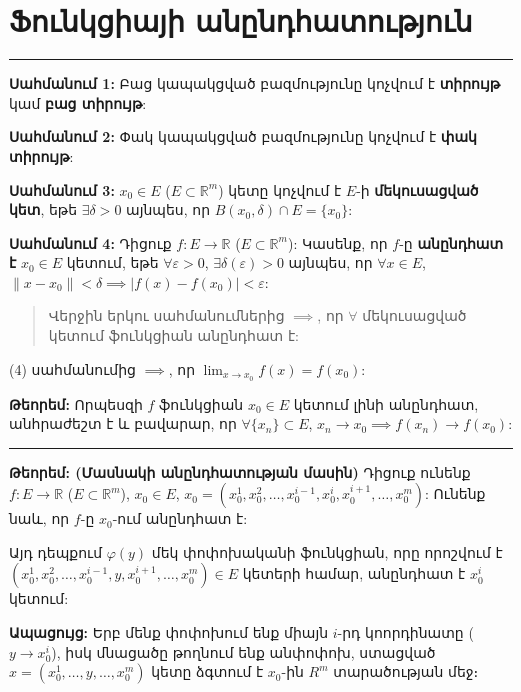 \documentclass[12pt, a4paper]{article}
\begin{document}
\section{Ֆունկցիայի անընդհատություն}

\tableofcontents

\vspace{2em}
\hrule
\vspace{2em}

\textbf{Սահմանում 1:} Բաց կապակցված բազմությունը կոչվում է \textbf{տիրույթ} կամ \textbf{բաց տիրույթ}:

\textbf{Սահմանում 2:} Փակ կապակցված բազմությունը կոչվում է \textbf{փակ տիրույթ}:

\textbf{Սահմանում 3:} $x_0 \in E$ ($E \subset \mathbb{R}^m$) կետը կոչվում է $E$-ի \textbf{մեկուսացված կետ}, եթե $\exists \delta > 0$ այնպես, որ $B(x_0, \delta) \cap E = \{x_0\}$:

\textbf{Սահմանում 4:} Դիցուք $f: E \to \mathbb{R}$ ($E \subset \mathbb{R}^m$): Կասենք, որ $f$-ը \textbf{անընդհատ է} $x_0 \in E$ կետում, եթե $\forall \varepsilon > 0$, $\exists \delta(\varepsilon) > 0$ այնպես, որ $\forall x \in E$, $\|x - x_0\| < \delta \implies |f(x) - f(x_0)| < \varepsilon$:

\begin{quote}
Վերջին երկու սահմանումներից $\implies$, որ $\forall$ մեկուսացված կետում ֆունկցիան անընդհատ է:
\end{quote}

(4) սահմանումից $\implies$, որ $\lim_{x \to x_0} f(x) = f(x_0)$:

\textbf{Թեորեմ:} Որպեսզի $f$ ֆունկցիան $x_0 \in E$ կետում լինի անընդհատ, անհրաժեշտ է և բավարար, որ $\forall \{x_n\} \subset E$, $x_n \to x_0 \implies f(x_n) \to f(x_0)$:

\vspace{1em}
\hrule
\vspace{1em}

\textbf{Թեորեմ: (Մասնակի անընդհատության մասին)} Դիցուք ունենք $f: E \to \mathbb{R}$ ($E \subset \mathbb{R}^m$), $x_0 \in E$, $x_0 = (x_0^1, x_0^2, \dots, x_0^{i-1}, x_0^i, x_0^{i+1}, \dots, x_0^m)$: Ունենք նաև, որ $f$-ը $x_0$-ում անընդհատ է:

Այդ դեպքում $\varphi(y)$ մեկ փոփոխականի ֆունկցիան, որը որոշվում է $(x_0^1, x_0^2, \dots, x_0^{i-1}, y, x_0^{i+1}, \dots, x_0^m) \in E$ կետերի համար, անընդհատ է $x_0^i$ կետում:

\textbf{Ապացույց:} Երբ մենք փոփոխում ենք միայն $i$-րդ կոորդինատը ($y \to x_0^i$), իսկ մնացածը թողնում ենք անփոփոխ, ստացված $x = (x_0^1, \dots, y, \dots, x_0^m)$ կետը ձգտում է $x_0$-ին $R^m$ տարածության մեջ։
\end{document}
